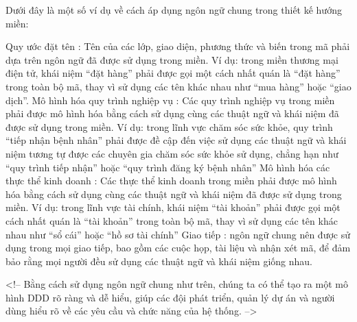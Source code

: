 Dưới đây là một số ví dụ về cách áp dụng ngôn ngữ chung trong thiết kế hướng miền:

Quy ước đặt tên : Tên của các lớp, giao diện, phương thức và biến trong mã phải dựa trên ngôn ngữ đã được sử dụng trong miền. Ví dụ: trong miền thương mại điện tử, khái niệm “đặt hàng” phải được gọi một cách nhất quán là “đặt hàng” trong toàn bộ mã, thay vì sử dụng các tên khác nhau như “mua hàng” hoặc “giao dịch”.
Mô hình hóa quy trình nghiệp vụ : Các quy trình nghiệp vụ trong miền phải được mô hình hóa bằng cách sử dụng cùng các thuật ngữ và khái niệm đã được sử dụng trong miền. Ví dụ: trong lĩnh vực chăm sóc sức khỏe, quy trình “tiếp nhận bệnh nhân” phải được đề cập đến việc sử dụng các thuật ngữ và khái niệm tương tự được các chuyên gia chăm sóc sức khỏe sử dụng, chẳng hạn như “quy trình tiếp nhận” hoặc “quy trình đăng ký bệnh nhân”
Mô hình hóa các thực thể kinh doanh : Các thực thể kinh doanh trong miền phải được mô hình hóa bằng cách sử dụng cùng các thuật ngữ và khái niệm đã được sử dụng trong miền. Ví dụ: trong lĩnh vực tài chính, khái niệm “tài khoản” phải được gọi một cách nhất quán là “tài khoản” trong toàn bộ mã, thay vì sử dụng các tên khác nhau như “sổ cái” hoặc “hồ sơ tài chính”
Giao tiếp : ngôn ngữ chung nên được sử dụng trong mọi giao tiếp, bao gồm các cuộc họp, tài liệu và nhận xét mã, để đảm bảo rằng mọi người đều sử dụng các thuật ngữ và khái niệm giống nhau.




<!-- Bằng cách sử dụng ngôn ngữ chung như trên, chúng ta có thể tạo ra một mô hình DDD rõ ràng và dễ hiểu, giúp các đội phát triển, quản lý dự án và người dùng hiểu rõ về các yêu cầu và chức năng của hệ thống. -->
